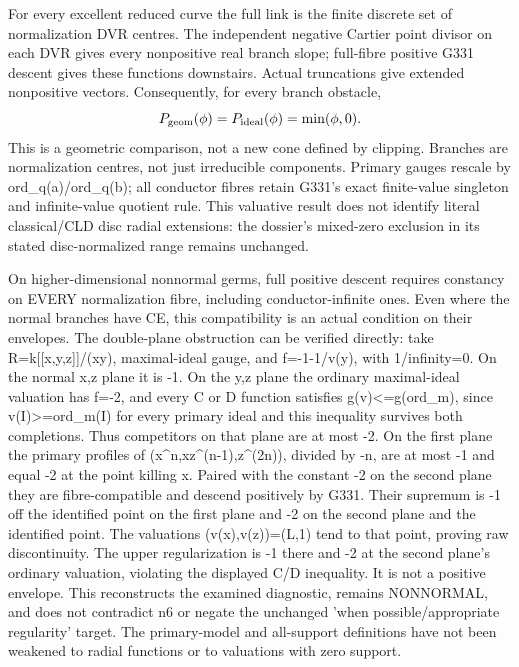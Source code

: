 \documentclass[11pt]{article}
\begin{document}
For every excellent reduced curve the full link is the finite discrete set of normalization DVR centres. The independent negative Cartier point divisor on each DVR gives every nonpositive real branch slope; full-fibre positive G331 descent gives these functions downstairs. Actual truncations give extended nonpositive vectors. Consequently, for every branch obstacle,
\[
P_{\rm geom}(\phi)=P_{\rm ideal}(\phi)=\min(\phi,0).
\]
This is a geometric comparison, not a new cone defined by clipping. Branches are normalization centres, not just irreducible components. Primary gauges rescale by ord\_q(a)/ord\_q(b); all conductor fibres retain G331's exact finite-value singleton and infinite-value quotient rule. This valuative result does not identify literal classical/CLD disc radial extensions: the dossier's mixed-zero exclusion in its stated disc-normalized range remains unchanged.

On higher-dimensional nonnormal germs, full positive descent requires constancy on EVERY normalization fibre, including conductor-infinite ones. Even where the normal branches have CE, this compatibility is an actual condition on their envelopes. The double-plane obstruction can be verified directly: take R=k[[x,y,z]]/(xy), maximal-ideal gauge, and f=-1-1/v(y), with 1/infinity=0. On the normal x,z plane it is -1. On the y,z plane the ordinary maximal-ideal valuation has f=-2, and every C or D function satisfies g(v)<=g(ord\_m), since v(I)>=ord\_m(I) for every primary ideal and this inequality survives both completions. Thus competitors on that plane are at most -2. On the first plane the primary profiles of (x\textasciicircum{}n,xz\textasciicircum{}(n-1),z\textasciicircum{}(2n)), divided by -n, are at most -1 and equal -2 at the point killing x. Paired with the constant -2 on the second plane they are fibre-compatible and descend positively by G331. Their supremum is -1 off the identified point on the first plane and -2 on the second plane and the identified point. The valuations (v(x),v(z))=(L,1) tend to that point, proving raw discontinuity. The upper regularization is -1 there and -2 at the second plane's ordinary valuation, violating the displayed C/D inequality. It is not a positive envelope. This reconstructs the examined diagnostic, remains NONNORMAL, and does not contradict n6 or negate the unchanged 'when possible/appropriate regularity' target. The primary-model and all-support definitions have not been weakened to radial functions or to valuations with zero support.
\end{document}
